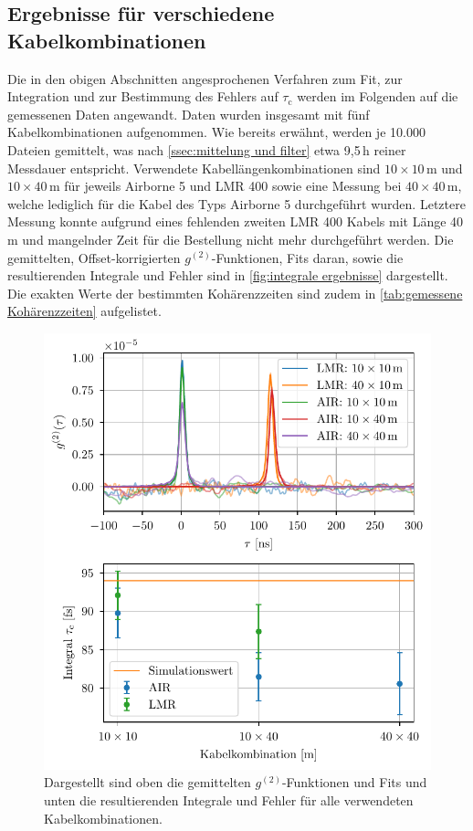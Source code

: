 \subsection{Ergebnisse für verschiedene Kabelkombinationen}
\label{ssec:Ergebnisse für verschiedene Kabelkombinationen}
Die in den obigen Abschnitten angesprochenen Verfahren zum Fit, zur Integration und zur Bestimmung des Fehlers auf $\tau_{\mathrm{c}}$ werden im Folgenden auf die gemessenen Daten angewandt. 
Daten wurden insgesamt mit fünf Kabelkombinationen aufgenommen. 
Wie bereits erwähnt, werden je 10{.}000 Dateien gemittelt, was nach \autoref{ssec:mittelung und filter} etwa 9{,}5\,h reiner Messdauer entspricht. 
Verwendete Kabellängenkombinationen sind $10\times 10\,\mathrm{m}$ und $10\times 40\,\mathrm{m}$ für jeweils Airborne 5 und LMR 400 sowie eine Messung bei $40\times 40\,\mathrm{m}$, welche lediglich für die Kabel des Typs Airborne 5 durchgeführt wurden. 
Letztere Messung konnte aufgrund eines fehlenden zweiten LMR 400 Kabels mit Länge 40\,m und mangelnder Zeit für die Bestellung nicht mehr durchgeführt werden. 
Die gemittelten, Offset-korrigierten $g^{(2)}$-Funktionen, Fits daran, sowie die resultierenden Integrale und Fehler sind in \autoref{fig:integrale ergebnisse} dargestellt. 
Die exakten Werte der bestimmten Kohärenzzeiten sind zudem in \autoref{tab:gemessene Kohärenzzeiten} aufgelistet. 
\begin{figure}[hp]
    \centering
    \includegraphics{images/Analysis/all_combined.pdf}
    \caption{Dargestellt sind oben die gemittelten $g^{(2)}$-Funktionen und Fits und unten die resultierenden Integrale und Fehler für alle verwendeten Kabelkombinationen.}
    \label{fig:integrale ergebnisse}
\end{figure}
